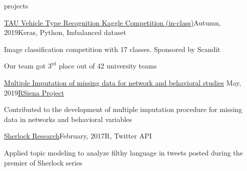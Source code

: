 \documentclass[]{resume} %
\begin{document}
\begin{rSection}{projects}
  
  
  \begin{rSubsection}{\href{https://github.com/schatt89/VehicleRecognition}{TAU Vehicle Type Recognition Kaggle Competition (in-class)}}{Autumn, 2019}{Keras, Python, Imbalanced dataset}{~}
      \item Image classification competition with 17 classes. Sponsored by Scandit
        \item Our team got $3^{\text{rd}}$ place out of 42 university teams\\[-1.5em]
  \end{rSubsection}
  
  \begin{rSubsection}{\hspace{-1ex} \href{https://www.stats.ox.ac.uk/~snijders/siena/MultipleImputationNetworkAndBehavior.html}{Multiple Imputation of missing data for network and behavioral studies} \hfill}{May, 2019}{\href{https://www.stats.ox.ac.uk/~snijders/siena/}{RSiena Project}}{~}
      \item Contributed to the development of multiple imputation procedure for missing data in networks and behavioral variables \\[-4.5ex]
  \end{rSubsection}
  
  \begin{rSubsection}{\href{https://schatt89.github.io/sherlocknight/}{Sherlock Research}}{February, 2017}{R, Twitter API}{~} %
    \item Applied topic modeling to analyze filthy language in tweets posted during the premier of Sherlock series \\[-4.5ex]
  \end{rSubsection}
  

\end{rSection}
\end{document}
